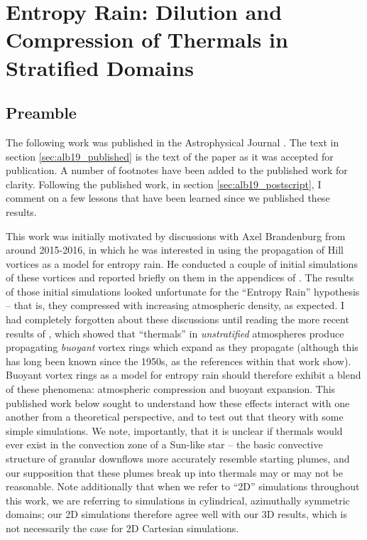 \chapter{Entropy Rain: Dilution and Compression of Thermals in Stratified Domains}
\label{ch:alb19}

\section{Preamble}
The following work was published in the Astrophysical Journal \citep{andersLB2019}.
The text in section \ref{sec:alb19_published} is the text of the paper as it was accepted for publication.
A number of footnotes have been added to the published work for clarity.
Following the published work, in section \ref{sec:alb19_postscript}, I comment on a few lessons that have been learned since we published these results.

This work was initially motivated by discussions with Axel Brandenburg from around 2015-2016, in which he was interested in using the propagation of Hill vortices as a model for entropy rain.
He conducted a couple of initial simulations of these vortices and reported briefly on them in the appendices of \citet	{brandenburg2016}.
The results of those initial simulations looked unfortunate for the ``Entropy Rain'' hypothesis -- that is, they compressed with increasing atmospheric density, as expected.
I had completely forgotten about these discussions until reading the more recent results of \citet{lecoanet&jeevanjee2019}, which showed that ``thermals'' in \emph{unstratified} atmospheres produce propagating \emph{buoyant} vortex rings which expand as they propagate (although this has long been known since the 1950s, as the references within that work show).
Buoyant vortex rings as a model for entropy rain should therefore exhibit a blend of these phenomena: atmospheric compression and buoyant expansion.
This published work below sought to understand how these effects interact with one another from a theoretical perspective, and to test out that theory with some simple simulations.
We note, importantly, that it is unclear if thermals would ever exist in the convection zone of a Sun-like star -- the basic convective structure of granular downflows more accurately resemble starting plumes, and our supposition that these plumes break up into thermals may or may not be reasonable.
Note additionally that when we refer to ``2D'' simulations throughout this work, we are referring to simulations in cylindrical, azimuthally symmetric domains; our 2D simulations therefore agree well with our 3D results, which is not necessarily the case for 2D Cartesian simulations.

